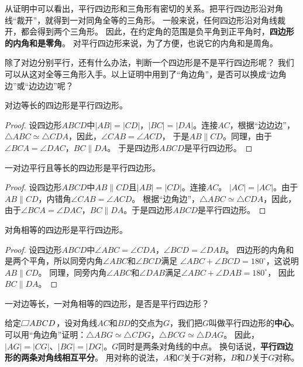 \documentclass[12pt,UTF8,fontset=none]{ctexbook}
\begin{document}
从证明中可以看出，平行四边形和三角形有密切的关系。把平行四边形沿对角线“裁开”，就得到一对同角全等的三角形。
一般来说，任何四边形沿对角线裁开，都会得到两个三角形。
因此，在约定角的范围是负平角到正平角时，\textbf{四边形的内角和是零角}。
对平行四边形来说，为了方便，也说它的内角和是周角。

除了对边分别平行，还有什么办法，判断一个四边形是不是平行四边形呢？
我们可以从这对全等三角形入手。以上证明中用到了“角边角”，是否可以换成“边角边”或“边边边”呢？

\begin{tm}\label{tm:0-0-1}
    对边等长的四边形是平行四边形。
\end{tm}
\begin{proof}
    设四边形$ABCD$中$|AB| = |CD|$，$|BC| = |DA|$。连接$AC$，根据“边边边”，
    $\triangle ABC \simeq \triangle CDA$，因此，$\angle CAB = \angle ACD$，
    于是$AB \parallel CD$。同理，由于$\angle BCA = \angle DAC$，$BC \parallel DA$。
    于是四边形$ABCD$是平行四边形。
\end{proof}

\begin{tm}\label{tm:0-0-2}
    一对边平行且等长的四边形是平行四边形。
\end{tm}
\begin{proof}
    设四边形$ABCD$中$AB \parallel CD$且$|AB| = |CD|$。连接$AC$。
    $|AC| = |AC|$。由于$AB \parallel CD$，内错角$\angle CAB = \angle ACD$。
    根据“边角边”，$\triangle ABC \simeq \triangle CDA$，因此，
    由于$\angle BCA = \angle DAC$，$BC \parallel DA$。于是四边形$ABCD$是平行四边形。
\end{proof}

\begin{tm}\label{tm:0-0-3}
    对角相等的四边形是平行四边形。
\end{tm}
\begin{proof}
    设四边形$ABCD$中$\angle ABC = \angle CDA$，$\angle BCD = \angle DAB$。
    四边形的内角和是两个平角，所以同旁内角$\angle ABC$和$\angle BCD$满足
    $\angle ABC + \angle BCD = 180^\circ$，这说明$AB \parallel CD$。
    同理，同旁内角$\angle ABC$和$\angle DAB$满足$\angle ABC + \angle DAB = 180^\circ$，
    因此$BC \parallel DA$。
\end{proof}

\begin{sk}\label{sk:0-0-0}
    一对边等长，一对角相等的四边形，是否是平行四边形？
\end{sk}

给定$\parasbx ABCD$，设对角线$AC$和$BD$的交点为$G$，我们把$G$叫做平行四边形的\textbf{中心}。
可以用“角边角”证明：$\triangle ABG \simeq \triangle CDG$，$\triangle BCG \simeq \triangle DAG$。
因此，$|AG| = |CG|$、$|BG| = |DG|$。$G$同时是两条对角线的中点。
换句话说，\textbf{平行四边形的两条对角线相互平分}。
用对称的说法，$A$和$C$关于$G$对称，$B$和$D$关于$G$对称。
\end{document}
